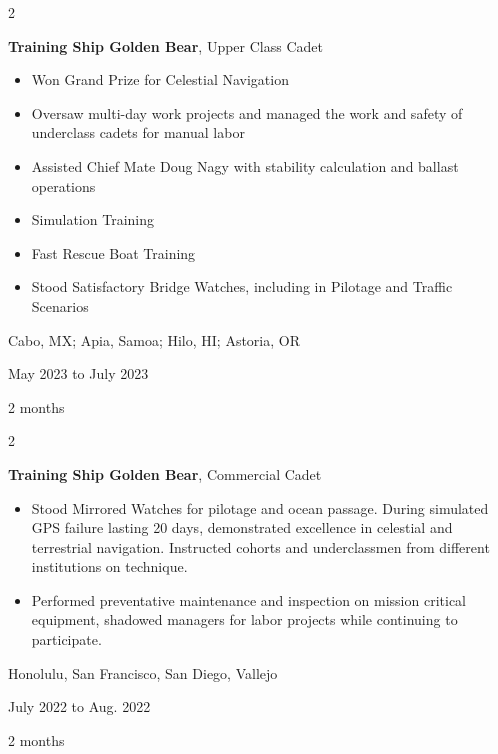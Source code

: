 \documentclass[10pt, letterpaper]{article}
\newenvironment{highlights}{
    \begin{itemize}[
        topsep=0.10 cm,
        parsep=0.10 cm,
        partopsep=0pt,
        itemsep=0pt,
        leftmargin=0.4 cm + 10pt
    ]
}{
    \end{itemize}
} %
\newenvironment{twocolentry}[2][]{
    \onecolentry
    \def\secondColumn{#2}
    \setcolumnwidth{\fill, 4.5 cm}
    \begin{paracol}{2}
}{
    \switchcolumn \raggedleft \secondColumn
    \end{paracol}
    \endonecolentry
} %
\begin{document}
        \vspace{0.2 cm}

        \begin{twocolentry}{
            Cabo, MX; Apia, Samoa; Hilo, HI; Astoria, OR

        May 2023 to July 2023

        2 months
        }
            \textbf{Training Ship Golden Bear}, Upper Class Cadet
            \begin{highlights}
                \item Won Grand Prize for Celestial Navigation
                \item Oversaw multi-day work projects and managed the work and safety of underclass cadets for manual labor
                \item Assisted Chief Mate Doug Nagy with stability calculation and ballast operations
                \item Simulation Training
                \item Fast Rescue Boat Training
                \item Stood Satisfactory Bridge Watches, including in Pilotage and Traffic Scenarios
            \end{highlights}
        \end{twocolentry}


        \vspace{0.2 cm}

        \begin{twocolentry}{
            Honolulu, San Francisco, San Diego, Vallejo

        July 2022 to Aug. 2022

        2 months
        }
            \textbf{Training Ship Golden Bear}, Commercial Cadet
            \begin{highlights}
                \item Stood Mirrored Watches for pilotage and ocean passage. During simulated GPS failure lasting 20 days, demonstrated excellence in celestial and terrestrial navigation. Instructed cohorts and underclassmen from different institutions on technique.
                \item Performed preventative maintenance and inspection on mission critical equipment, shadowed managers for labor projects while continuing to participate.
            \end{highlights}
        \end{twocolentry}
\end{document}
